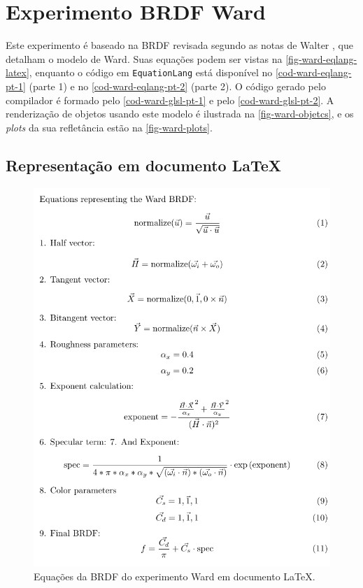 
\section{Experimento BRDF Ward} \label{section-experiment-ward}

Este experimento é baseado na BRDF revisada segundo as notas de Walter \cite{walter2005notes}, que detalham o modelo de Ward. Suas equações podem ser vistas na \autoref{fig-ward-eqlang-latex}, enquanto o código em \texttt{EquationLang} está disponível no \autoref{cod-ward-eqlang-pt-1} (parte 1) e no \autoref{cod-ward-eqlang-pt-2} (parte 2). O código gerado pelo compilador é formado pelo \autoref{cod-ward-glsl-pt-1} e pelo \autoref{cod-ward-glsl-pt-2}. A renderização de objetos usando este modelo é ilustrada na \autoref{fig-ward-objetcs}, e os \textit{plots} da sua refletância estão na \autoref{fig-ward-plots}.


\subsection{Representação em documento \LaTeX{}}
\begin{figure}[H]
    \caption{\label{fig-ward-eqlang-latex} \small Equações da BRDF do experimento Ward em documento \LaTeX{}.}
    \begin{center}
        \includegraphics[scale=0.92]{./Imagens/brdfs/ward.pdf}
    \end{center}
\end{figure}

